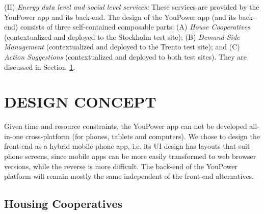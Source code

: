 (II) \textit{Energy data level and social level services:} These services are provided by the YouPower app and its back-end. The design of the YouPower app (and its back-end) consists of three self-contained composable parts: (A) \textit{House Cooperatives} (contextualized and deployed to the Stockholm test site); (B) \textit{Demand-Side Management} (contextualized and deployed
to the Trento test site); and (C) \textit{Action Suggestions} (contextualized and deployed to both test sites). They are discussed in Section~\ref{sect:design_concept}.

\section{\uppercase{Design Concept}}
\label{sect:design_concept}

\noindent Given time and resource constraints, the YouPower app can not be developed all-in-one cross-platform (for phones, tablets and computers). We chose to design the front-end as a hybrid mobile phone app, i.e. its UI design has layouts that suit phone screens, %
since mobile apps can be more easily transformed to web browser versions, while the reverse is more difficult. The back-end of the YouPower platform will remain mostly the same independent of the front-end alternatives. 

\subsection{Housing Cooperatives}
\label{sect:brf}

